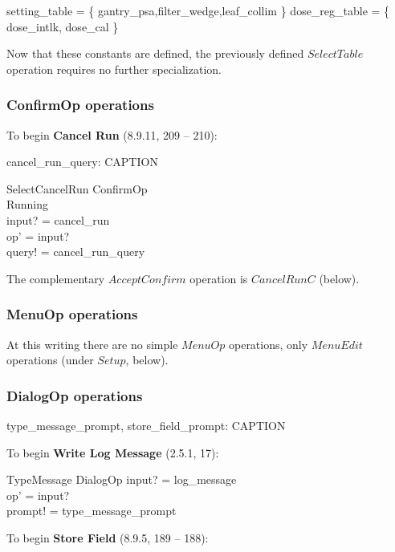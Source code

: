 \begin{zed}
	setting\_table = \{ gantry\_psa,filter\_wedge,leaf\_collim \}
\also
	dose\_reg\_table = \{ dose\_intlk, dose\_cal \}
\end{zed}
Now that these constants are defined, the previously defined
$SelectTable$ operation requires no further specialization.

\subsubsection{ConfirmOp operations}

To begin {\bf Cancel Run} (8.9.11, 209 -- 210):

\begin{axdef}
	cancel\_run\_query: CAPTION
\end{axdef}

\begin{schema}{SelectCancelRun}
	ConfirmOp \\
\where	
	Running \\
	input? = cancel\_run \\
	op' = input? \\
	query! = cancel\_run\_query
\end{schema}
The complementary $AcceptConfirm$ operation is $CancelRunC$ (below).

\subsubsection{MenuOp operations}

At this writing there are no simple $MenuOp$ operations, only
$MenuEdit$ operations (under $Setup$, below).

\subsubsection{DialogOp operations}


\begin{axdef}
	type\_message\_prompt, store\_field\_prompt: CAPTION
\end{axdef}

To begin {\bf Write Log Message} (2.5.1, 17):

\begin{schema}{TypeMessage}
	DialogOp
\where
	input? = log\_message \\
	op' = input?  \\
	prompt! = type\_message\_prompt
\end{schema}
To begin {\bf Store Field} (8.9.5, 189 -- 188):

